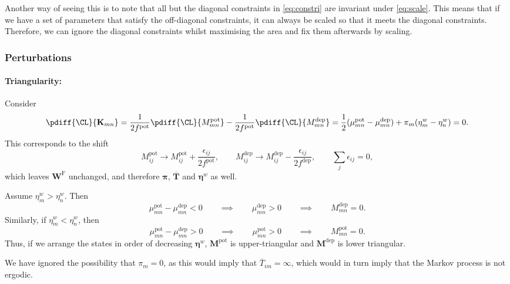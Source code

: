 \documentclass[12pt]{article}
\newcommand{\eqm}{\pi}
\newcommand{\eq}{\boldsymbol{\eqm}}
\newcommand{\fptm}{T}
\newcommand{\fpt}{\mathbf{\fptm}}
\newcommand{\fptbm}{\overline{\fptm}}
\newcommand{\fptb}{\overline{\fpt}}
\newcommand{\etwm}{\eta^w}
\newcommand{\etw}{\boldsymbol{\eta}^w}
\newcommand{\Wm}{W}
\newcommand{\W}{\mathbf{\Wm}}
\newcommand{\MMdm}{M}
\newcommand{\MMd}{\mathbf{\MMdm}}
\newcommand{\encm}{K}
\newcommand{\enc}{\mathbf{\encm}}
\newcommand{\frg}{\W^{\mathrm{F}}}
\newcommand{\pot}{^{\text{pot}}}
\newcommand{\dep}{^{\text{dep}}}
\begin{document}
Another way of seeing this is to note that all but the diagonal constraints in \cref{eq:constri} are invariant under \cref{eq:scale}.
This means that if we have a set of parameters that satisfy the off-diagonal constraints, it can always be scaled so that it meets the diagonal constraints.
Therefore, we can ignore the diagonal constraints whilst maximising the area and fix them afterwards by  scaling.


\subsubsection{Perturbations}\label{sec:areapert}

\paragraph{Triangularity:}\label{sec:triangular}

Consider
%
\begin{equation}\label{eq:shiftqderiv}
  \pdiff{\CL}{\enc_{mn}} =
  \frac{1}{2f\pot} \pdiff{\CL}{\MMdm\pot_{mn}} - \frac{1}{2f\pot} \pdiff{\CL}{\MMdm\dep_{mn}}
   = \frac{1}{2}(\mu\pot_{mn} - \mu\dep_{mn}) + \eqm_m (\etwm_m - \etwm_n)
   = 0.
\end{equation}
%
This corresponds to the shift
%
\begin{equation}\label{eq:shiftq}
  \MMdm\pot_{ij} \to \MMdm\pot_{ij} + \frac{\epsilon_{ij}}{2f\pot},
  \qquad
  \MMdm\dep_{ij} \to \MMdm\dep_{ij} - \frac{\epsilon_{ij}}{2f\dep},
  \qquad
  \sum_j \epsilon_{ij} = 0,
\end{equation}
%
which leaves $\frg$ unchanged, and therefore $\eq$, $\fptb$ and $\etw$ as well.

Assume $\etwm_m > \etwm_n$. Then
%
\begin{equation}\label{eq:lowertriangular}
 \mu\pot_{mn} - \mu\dep_{mn} < 0
 \qquad\implies\qquad
 \mu\dep_{mn} > 0
 \qquad\implies\qquad
 \MMdm\dep_{mn} = 0.
\end{equation}
%
Similarly, if $\etwm_m < \etwm_n$, then
%
\begin{equation}\label{eq:uppertriangular}
 \mu\pot_{mn} - \mu\dep_{mn} > 0
 \qquad\implies\qquad
 \mu\pot_{mn} >0
 \qquad\implies\qquad
 \MMdm\pot_{mn}=0.
\end{equation}
%
Thus, if we arrange the states in order of decreasing $\etw$, $\MMd\pot$ is upper-triangular and $\MMd\dep$ is lower triangular.

We have ignored the possibility that $\eqm_m = 0$, as this would imply that $\fptbm_{im} = \infty$, which would in turn imply that the Markov process is not ergodic.
\end{document}

